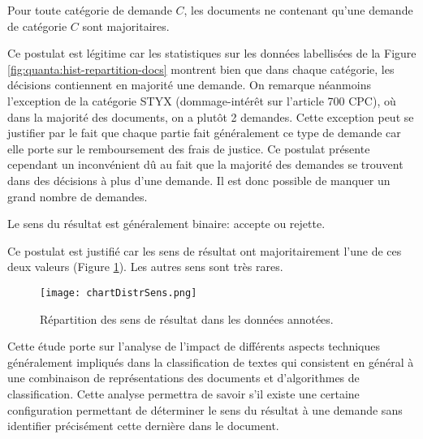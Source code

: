 \begin{postulat}\label{postulat:sens:unedemande}
Pour toute catégorie de demande $C$, les documents ne contenant qu'une demande de catégorie $C$ sont majoritaires. %
\end{postulat} 
Ce postulat est légitime car les statistiques sur les données labellisées de la Figure \ref{fig:quanta:hist-repartition-docs} montrent bien que dans chaque catégorie, les décisions contiennent en majorité une demande. On remarque néanmoins l'exception de la catégorie STYX (dommage-intérêt sur l'article 700 CPC), où dans la majorité des documents, on a plutôt 2 demandes. Cette exception peut se justifier par le fait que chaque partie fait généralement ce type de demande car elle porte sur le remboursement des frais de justice. Ce postulat présente cependant un inconvénient dû au fait que la majorité des demandes se trouvent dans des décisions à plus d'une demande. Il est donc possible de manquer un grand nombre de demandes. %

\begin{postulat}\label{postulat:sens:sensbinaire}
Le sens du résultat est généralement binaire: accepte ou rejette.
\end{postulat} 
Ce postulat est justifié car les sens de résultat ont majoritairement l'une de ces deux valeurs (Figure \ref{stat-sensrst}). Les autres sens sont très rares.

\begin{figure}
\texttt{[image: chartDistrSens.png]}
\caption{Répartition des sens de résultat dans les données annotées.}\label{stat-sensrst}
\end{figure}

Cette étude porte sur l'analyse de l'impact de différents aspects techniques généralement impliqués dans la classification de textes qui consistent en général à une combinaison de représentations des documents et d'algorithmes de classification. Cette analyse permettra de savoir s'il existe une certaine configuration permettant de déterminer le sens du résultat à une demande sans identifier précisément cette dernière dans le document. 


